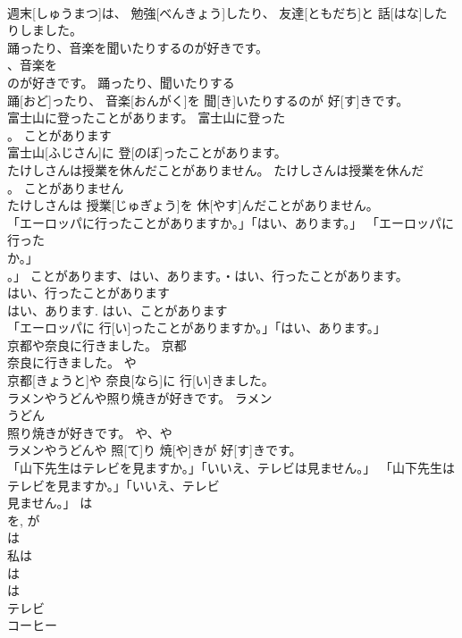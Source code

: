 \documentclass[8pt]{extreport}
\begin{document}
\begin{CJK}{UTF8}{min}
\\	週末[しゅうまつ]は、 勉強[べんきょう]したり、 友達[ともだち]と 話[はな]したりしました。	
\\	踊ったり、音楽を聞いたりするのが好きです。	
\\	、音楽を
\\	のが好きです。	踊ったり、聞いたりする	
\\	踊[おど]ったり、 音楽[おんがく]を 聞[き]いたりするのが 好[す]きです。	
\\	富士山に登ったことがあります。	富士山に登った
\\	。	ことがあります	
\\	富士山[ふじさん]に 登[のぼ]ったことがあります。	
\\	たけしさんは授業を休んだことがありません。	たけしさんは授業を休んだ
\\	。	ことがありません	
\\	たけしさんは 授業[じゅぎょう]を 休[やす]んだことがありません。	
\\	「エーロッパに行ったことがありますか。」「はい、あります。」	「エーロッパに行った
\\	か。」
\\	。」	ことがあります、はい、あります。・はい、行ったことがあります。	
\\	はい、行ったことがあります 
\\	はい、あります. はい、ことがあります 
\\	「エーロッパに 行[い]ったことがありますか。」「はい、あります。」	
\\	京都や奈良に行きました。	京都
\\	奈良に行きました。	や	
\\	京都[きょうと]や 奈良[なら]に 行[い]きました。	
\\	ラメンやうどんや照り焼きが好きです。	ラメン
\\	うどん
\\	照り焼きが好きです。	や、や	
\\	ラメンやうどんや 照[て]り 焼[や]きが 好[す]きです。	
\\	「山下先生はテレビを見ますか。」「いいえ、テレビは見ません。」	「山下先生はテレビを見ますか。」「いいえ、テレビ
\\	見ません。」	は	
\\	を, が 
\\	は 
\\	私は 
\\	は 
\\	は 
\\	テレビ 
\\	コーヒー 

\end{CJK}
\end{document}
